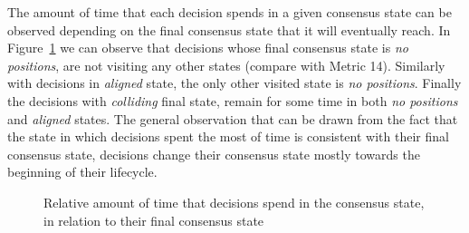 \documentclass[article]{elsarticle}
\begin{document}
The amount of time that each decision spends in a given consensus state can be observed depending on the final consensus state that it will eventually reach.
%
In Figure~\ref{fig:M11} we can observe that decisions whose final consensus state is \emph{no positions}, are not visiting any other states (compare with Metric 14). Similarly with decisions in \emph{aligned} state, the only other visited state is \emph{no positions}. Finally the decisions with \emph{colliding} final state, remain for some time in both \emph{no positions} and \emph{aligned} states. The general observation that can be drawn from the fact that the state in which decisions spent the most of time is consistent with their final consensus state, decisions change their consensus state mostly towards the beginning of their lifecycle. 
\begin{figure}
  \begin{center}
 

  \caption{Relative amount of time that decisions spend in the consensus state, in relation to their final consensus state}
  \label{fig:M11}
  \end{center}
\end{figure}
\end{document}
